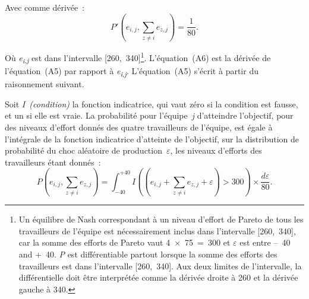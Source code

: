 \begin{Article}
\begin{refsection}[Lebourges]
\begin{appendices}
Avec comme dérivée~:
\begin{equation}
    P'\left( e_{i,j},\sum_{z \neq i}^{}e_{z,j} \right) = \frac{1}{80}.
\end{equation}

Où \emph{e\textsubscript{i}}\textsubscript{,\emph{j}} est dans
l'intervalle [260,~340]\footnote{Un équilibre de Nash correspondant à
  un niveau d'effort de Pareto de tous les travailleurs de l'équipe est
  nécessairement inclus dans l'intervalle [260,~340], car la somme
  des efforts de Pareto vaut 4~×~75~=~300 et $\varepsilon$ est entre --~40
  and +~40. \emph{P} est différentiable partout lorsque la somme des
  efforts des travailleurs est dans l'intervalle [260,~340]. Aux
  deux limites de l'intervalle, la différentielle doit être interprétée
  comme la dérivée droite à 260 et la dérivée gauche à 340.}.
L'équation~(A6) est la dérivée de l'équation~(A5) par rapport à
\emph{e\textsubscript{i}}\textsubscript{,\emph{j}}. L'équation~(A5)
s'écrit à partir du raisonnement suivant.

Soit \emph{I~(condition)} la fonction indicatrice, qui vaut zéro si la
condition est fausse, et un si elle est vraie. La probabilité pour
l'équipe~\emph{j} d'atteindre l'objectif, pour des niveaux d'effort
donnés des quatre travailleurs de l'équipe, est égale à l'intégrale de
la fonction indicatrice d'atteinte de l'objectif, sur la distribution de
probabilité du choc aléatoire de production~$\varepsilon$, les niveaux
d'efforts des travailleurs étant donnés~:
\begin{equation}
    P\left( e_{i,j},\sum_{z \neq i}^{}e_{z,j} \right) = \int_{- 40}^{+ 40}{I\left( \left( e_{i,j} + \sum_{z \neq i}^{}e_{z,j} + \varepsilon \right) > 300 \right) \times \frac{d\varepsilon}{80}}.
\end{equation}


\end{appendices}
\end{refsection}
\end{Article}
